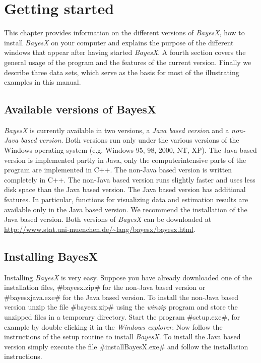 \chapter{Getting started}
\label{gettingstarted}

This chapter provides information on the different versions of
{\em BayesX}, how to install {\em BayesX} on your computer and
explains the purpose of the different windows that appear after
having started {\em BayesX}. A fourth section covers the general
usage of the program and the features of the current version.
Finally we describe three data sets, which serve as the basis for
most of the illustrating examples in this manual.

\section{Available versions of BayesX}
\label{availableversions} 
 
  {\em
BayesX} is currently available in two versions, a {\em Java based
version} and a {\em non-Java based version}. Both versions run
only under the various versions of the Windows operating system
(e.g. Windows 95, 98, 2000, NT, XP). The Java based version is
implemented partly in Java, only the computerintensive parts of
the program are implemented in C++. The non-Java based version is
written completely in C++. The non-Java based version runs
slightly faster and uses less disk space than the Java based
version. The Java based version has additional features. In
particular, functions for visualizing data and estimation results
are available only in the Java based version. We recommend the
installation of the Java based version. Both versions of {\em
BayesX} can be downloaded at
\href{http://www.stat.uni-muenchen.de/~lang/bayesx/bayesx.html}
{http://www.stat.uni-muenchen.de/\~{}lang/bayesx/bayesx.html}.


\section{Installing BayesX}
  Installing
{\em BayesX} is very easy. Suppose you have already downloaded one
of the installation files, #bayesx.zip# for the non-Java based
version or #bayesxjava.exe# for the Java based version. To
install the non-Java based version unzip  the file
#bayesx.zip# using the {\em winzip} program and store the unzipped
files in a temporary directory. Start the program #setup.exe#,
for example by double clicking it in the {\em Windows explorer}.
Now follow the instructions of the setup routine to install {\em
BayesX}. To install the Java based version simply execute the file
#installBayesX.exe# and follow the installation instructions.

